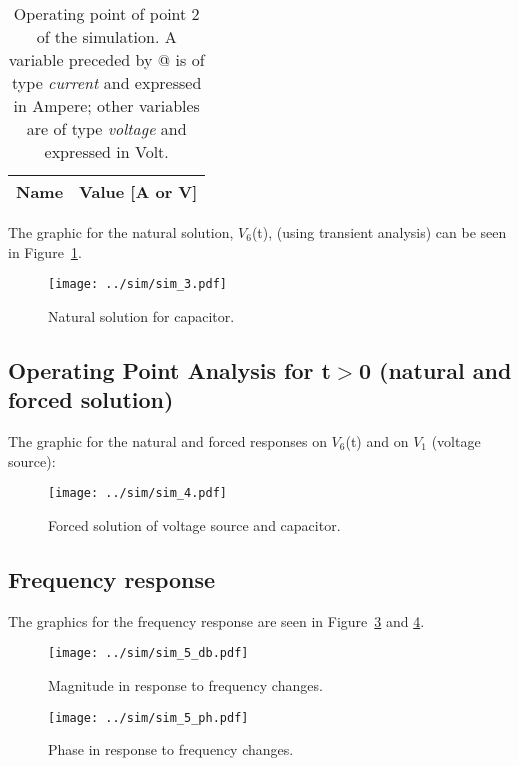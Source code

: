 \begin{table}[H]
  \centering
  \begin{tabular}{|l|r|}
    \hline    
    {\bf Name} & {\bf Value [A or V]} \\ \hline
    
  \end{tabular}
  \caption{Operating point of point 2 of the simulation. A variable preceded by @ is of type {\em current}
    and expressed in Ampere; other variables are of type {\it voltage} and expressed in
    Volt.}
  \label{tab:op2}
\end{table}


The graphic for the natural solution, $V_6$(t), (using transient analysis) can be seen in Figure~\ref{fig:nat_sol}.

\begin{figure}[H] \centering
\texttt{[image: ../sim/sim\_3.pdf]}
\caption{Natural solution for capacitor.}
\label{fig:nat_sol}
\end{figure}

\subsection{Operating Point Analysis for t$>$0 (natural and forced solution)}

\tab The graphic for the natural and forced responses on $V_6$(t) and on $V_1$ (voltage source):

\begin{figure}[H] \centering
\texttt{[image: ../sim/sim\_4.pdf]}
\caption{Forced solution of voltage source and capacitor.}
\label{fig:nat_for}
\end{figure}
\subsection{Frequency response}
\tab The graphics for the frequency response are seen in Figure~\ref{fig:db} and \ref{fig:ph}.

\begin{figure}[H] \centering
\texttt{[image: ../sim/sim\_5\_db.pdf]}
\caption{Magnitude in response to frequency changes.}
\label{fig:db}
\end{figure}

\begin{figure}[H] \centering
\texttt{[image: ../sim/sim\_5\_ph.pdf]}
\caption{Phase in response to frequency changes.}
\label{fig:ph}
\end{figure}

